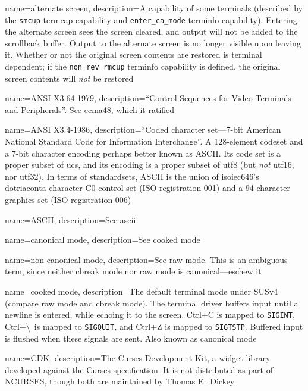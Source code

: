 {
  name={alternate screen},
  description={A capability of some terminals (described by the \texttt{smcup}
    termcap capability and \texttt{enter\_ca\_mode} terminfo capability). 
    Entering the alternate screen sees the screen cleared, and output will not
    be added to the scrollback buffer. Output to the alternate screen is no
    longer visible upon leaving it. Whether or not the original screen contents
    are restored is terminal dependent; if the \texttt{non\_rev\_rmcup}
    terminfo capability is defined, the original screen contents will \textit{not}
    be restored}
}

{
  name={ANSI X3.64-1979},
  description={``Control Sequences for Video Terminals and Peripherals''.
    See \Gls{ecma48}, which it ratified}
}

{
  name={ANSI X3.4-1986},
  description={``Coded character set---7-bit American National Standard Code
    for Information Interchange''. A 128-element codeset and a 7-bit character
    encoding perhaps better known as ASCII\cite{ascii}. Its code set is a
    proper subset of \Gls{ucs}, and its encoding is a proper subset of
    \gls{utf8} (but \textit{not} \gls{utf16}, nor \gls{utf32}). In terms of
    \gls{standardsets}, ASCII is the union of \Gls{isoiec646}'s
    dotriaconta-character \Gls{C0} control set (ISO registration 001) and
    a 94-character graphics set (ISO registration 006)}
}

{
  name={ASCII},
  description={See \Gls{ascii}}
}

{
  name={canonical mode},
  description={See \gls{cooked mode}}
}

{
  name={non-canonical mode},
  description={See \gls{raw mode}. This is an ambiguous term, since neither
    \gls{cbreak mode} nor \gls{raw mode} is canonical---eschew it}
}

{
  name={cooked mode},
description={The default terminal mode under SUSv4 (compare \gls{raw mode} and
\gls{cbreak mode}).
  The terminal driver buffers input until a newline is entered, while echoing
  it to the screen. Ctrl+C is mapped to \texttt{SIGINT}, Ctrl+\textbackslash\ is
  mapped to \texttt{SIGQUIT}, and Ctrl+Z is mapped to \texttt{SIGTSTP}.
  Buffered input is flushed when these signals are sent. Also known as
  \gls{canonical mode}}
}

{
  name={CDK},
description={The Curses Development Kit, a widget library developed against the
  Curses specification. It is not distributed as part of NCURSES, though
  both are maintained by Thomas E.\ Dickey}
}

